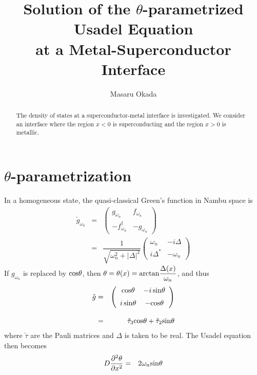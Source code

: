 \documentclass[uplatex,a4j,12pt,dvipdfmx]{jsarticle}
\title{Solution of the $\theta$-parametrized Usadel Equation \\ at a Metal-Superconductor Interface}
\author{
Masaru Okada
}
\begin{document}
\maketitle

\begin{abstract}
	The density of states at a superconductor-metal interface is investigated.
	We consider an interface where the region $x<0$ is superconducting and the region $x>0$ is metallic.
\end{abstract}

\section{$\theta$-parametrization}

In a homogeneous state,
the quasi-classical Green's function in Nambu space is
\begin{eqnarray}
	\check{g}_{\omega_{n}}
	&=&
	\left(
	\begin{array}{cc}
			g_{\omega_{n}}            & f_{\omega_{n}}
			\\[2mm]
			-f^{\dagger}_{\omega_{n}} & - g_{\omega_{n}}
		\end{array}
	\right)
	\nonumber \\[2mm] &=&
	\dfrac{1}{ \sqrt{ \omega_{n}^{2} + | \Delta |^{2} } }
	\left(
	\begin{array}{cc}
			\omega_{n}   & - i \Delta
			\\[2mm]
			i \Delta^{*} & - \omega_{n}
		\end{array}
	\right)
\end{eqnarray}
If $g_{\omega_{n}}$ is replaced by ${\rm cos} \theta$,
then $\theta = \theta(x) = {\rm arctan} \dfrac{\Delta(x)}{\omega_{n}}$,
and thus
\begin{eqnarray}
	\check{g}
	&=&
	\left(
	\begin{array}{cc}
			{\rm cos} \theta        & - i \ \! {\rm sin} \theta
			\\[2mm]
			i \ \! {\rm sin} \theta & - {\rm cos} \theta
		\end{array}
	\right)
	\nonumber \\[3mm] &=&
	\check{\tau}_{3} {\rm cos} \theta
	+
	\check{\tau}_{2} {\rm sin} \theta
\end{eqnarray}
where $\check{\tau}$ are the Pauli matrices
and $\Delta$ is taken to be real.
The Usadel equation then becomes
\begin{eqnarray}
	D
	\dfrac{\partial^{2} \theta}{\partial x^{2}}
	&=&
	2 \omega_{n} {\rm sin} \theta
\end{eqnarray}
\end{document}
